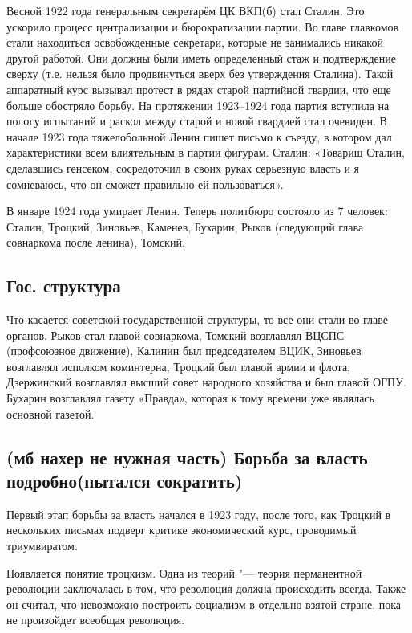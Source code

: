 Весной 1922 года генеральным секретарём ЦК ВКП(б) стал Сталин. Это ускорило процесс централизации и бюрократизации партии. Во главе главкомов стали находиться освобожденные секретари, которые не занимались никакой другой работой. Они должны были иметь определенный стаж и подтверждение сверху (т.е. нельзя было продвинуться вверх без утверждения Сталина). Такой аппаратный курс вызывал протест в рядах старой партийной гвардии, что еще больше обостряло борьбу. На протяжении 1923--1924 года партия вступила на полосу испытаний и раскол между старой  и новой гвардией стал очевиден. В начале 1923 года тяжелобольной Ленин пишет письмо к съезду, в котором дал характеристики всем влиятельным в партии фигурам. Сталин: «Товарищ Сталин, сделавшись генсеком, сосредоточил в своих руках серьезную власть и я сомневаюсь, что он сможет правильно ей пользоваться».

В январе 1924 года умирает Ленин. Теперь политбюро состояло из 7 человек: Сталин, Троцкий, Зиновьев, Каменев, Бухарин, Рыков (следующий глава совнаркома после ленина), Томский. 

\subsection{Гос. структура}

Что касается советской государственной структуры, то все они стали во главе органов. Рыков стал главой совнаркома, Томский возглавлял ВЦСПС (профсоюзное движение), Калинин был председателем ВЦИК, Зиновьев возглавлял исполком коминтерна, Троцкий был главой армии и флота, Дзержинский возглавлял высший совет народного хозяйства и был главой ОГПУ. Бухарин возглавлял газету «Правда», которая к тому времени уже являлась основной газетой.

\subsection{(мб нахер не нужная часть) Борьба за власть подробно(пытался сократить)}

Первый этап борьбы за власть начался в 1923 году, после того, как Троцкий в нескольких письмах подверг критике экономический курс, проводимый триумвиратом.

Появляется понятие троцкизм. Одна из теорий "--- теория перманентной революции заключалась в том, что революция должна происходить всегда. Также он считал, что невозможно построить социализм в отдельно взятой стране, пока не произойдет всеобщая революция. 

